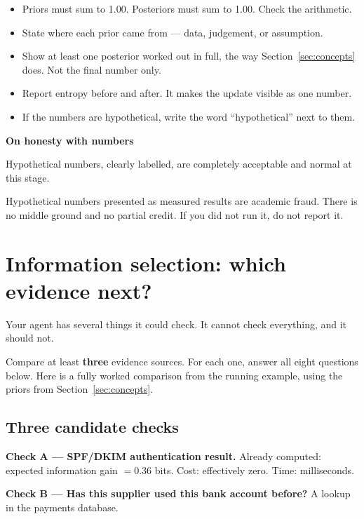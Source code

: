 \documentclass[11pt,a4paper]{article}
\newcommand{\boxtitle}[1]{{\bfseries #1}\par\vspace{2pt}}
\begin{document}
\begin{itemize}
  \item Priors must sum to 1.00. Posteriors must sum to 1.00. Check the arithmetic.
  \item State where each prior came from --- data, judgement, or assumption.
  \item Show at least one posterior worked out in full, the way Section~\ref{sec:concepts} does.
        Not the final number only.
  \item Report entropy before and after. It makes the update visible as one number.
  \item If the numbers are hypothetical, write the word ``hypothetical'' next to them.
\end{itemize}

\begin{sbbox}
\boxtitle{On honesty with numbers}
Hypothetical numbers, clearly labelled, are completely acceptable and normal at this stage.

Hypothetical numbers presented as measured results are academic fraud. There is no middle
ground and no partial credit. If you did not run it, do not report it.
\end{sbbox}

\section{Information selection: which evidence next?}
\label{sec:infoselect}

Your agent has several things it could check. It cannot check everything, and it should not.

Compare at least \textbf{three} evidence sources. For each one, answer all eight questions below.
Here is a fully worked comparison from the running example, using the priors from
Section~\ref{sec:concepts}.

\subsection{Three candidate checks}

\textbf{Check A --- SPF/DKIM authentication result.} Already computed:
expected information gain $= 0.36$ bits. Cost: effectively zero. Time: milliseconds.

\textbf{Check B --- Has this supplier used this bank account before?} A lookup in the payments
database.
\end{document}
